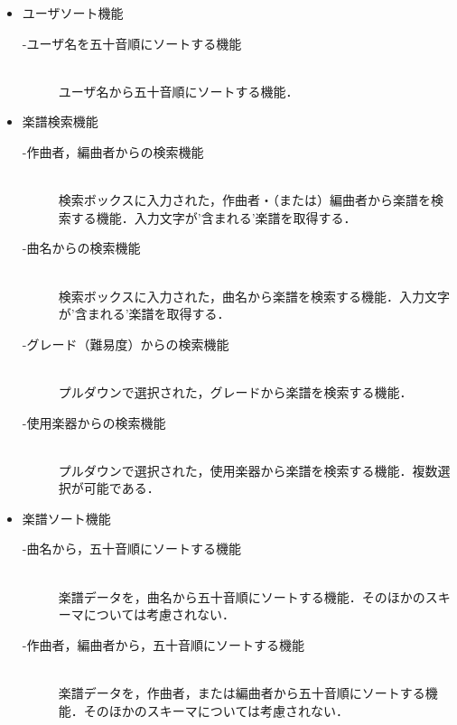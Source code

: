 \begin{itemize}
    \item ユーザソート機能
          \begin{description}
              \item[-ユーザ名を五十音順にソートする機能] \mbox{}\\
                  ユーザ名から五十音順にソートする機能．
          \end{description}
    \item 楽譜検索機能
          \begin{description}
              \item[-作曲者，編曲者からの検索機能]\mbox{}\\
              検索ボックスに入力された，作曲者・（または）編曲者から楽譜を検索する機能．入力文字が'含まれる'楽譜を取得する．
              \item[-曲名からの検索機能] \mbox{}\\
                  検索ボックスに入力された，曲名から楽譜を検索する機能．入力文字が'含まれる'楽譜を取得する．
              \item[-グレード（難易度）からの検索機能] \mbox{}\\
                  プルダウンで選択された，グレードから楽譜を検索する機能．
              \item[-使用楽器からの検索機能] \mbox{}\\
                  プルダウンで選択された，使用楽器から楽譜を検索する機能．複数選択が可能である．
          \end{description}
    \item 楽譜ソート機能
          \begin{description}
              \item[-曲名から，五十音順にソートする機能]\mbox{}\\
              楽譜データを，曲名から五十音順にソートする機能．そのほかのスキーマについては考慮されない．
              \item[-作曲者，編曲者から，五十音順にソートする機能] \mbox{}\\
                  楽譜データを，作曲者，または編曲者から五十音順にソートする機能．そのほかのスキーマについては考慮されない．

\end{description}
\end{itemize}
